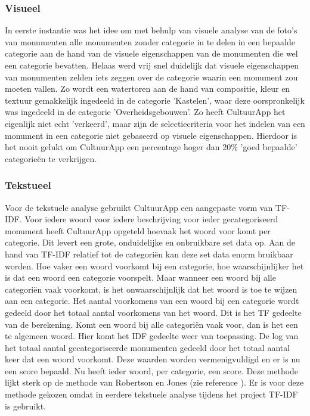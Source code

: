 \documentclass[a4paper,10pt]{article}
\begin{document}
		\subsubsection{Visueel}
		In eerste instantie was het idee om met behulp van visuele analyse van de foto's van monumenten alle monumenten zonder categorie in te delen in een bepaalde categorie aan de hand van de visuele eigenschappen van de monumenten die wel een categorie bevatten. Helaas werd vrij snel duidelijk dat visuele eigenschappen van monumenten zelden iets zeggen over de categorie waarin een monument zou moeten vallen. Zo wordt een watertoren aan de hand van compositie, kleur en textuur gemakkelijk ingedeeld in de categorie 'Kastelen', waar deze oorspronkelijk was ingedeeld in de categorie 'Overheidsgebouwen'. Zo heeft CultuurApp het eigenlijk niet echt 'verkeerd', maar zijn de selectiecriteria voor het indelen van een monument in een categorie niet gebaseerd op visuele eigenschappen. Hierdoor is het nooit gelukt om CultuurApp een percentage hoger dan 20\% 'goed bepaalde' categorie\"en te verkrijgen.
	
		\subsubsection{Tekstueel}
		Voor de tekstuele analyse gebruikt CultuurApp een aangepaste vorm van TF-IDF. Voor iedere woord voor iedere beschrijving voor ieder gecategoriseerd monument heeft CultuurApp opgeteld hoevaak het woord voor komt per categorie. Dit levert een grote, onduidelijke en onbruikbare set data op. Aan de hand van TF-IDF relatief tot de categori\"en kan deze set data enorm bruikbaar worden. Hoe vaker een woord voorkomt bij een categorie, hoe waarschijnlijker het is dat een woord een categorie voorspelt. Maar wanneer een woord bij alle categori\"en vaak voorkomt, is het onwaarschijnlijk dat het woord is toe te wijzen aan een categorie. Het aantal voorkomens van een woord bij een categorie wordt gedeeld door het totaal aantal voorkomens van het woord. Dit is het TF gedeelte van de berekening. Komt een woord bij alle categori\"en vaak voor, dan is het een te algemeen woord. Hier komt het IDF gedeelte weer van toepassing. De log van het totaal aantal gecategoriseerde monumenten gedeeld door het totaal aantal keer dat een woord voorkomt. Deze waarden worden vermenigvuldigd en er is nu een score bepaald. Nu heeft ieder woord, per categorie, een score. Deze methode lijkt sterk op de methode van Robertson en Jones (zie reference \cite{111}). Er is voor deze methode gekozen omdat in eerdere tekstuele analyse tijdens het project TF-IDF is gebruikt.
		
\end{document}
